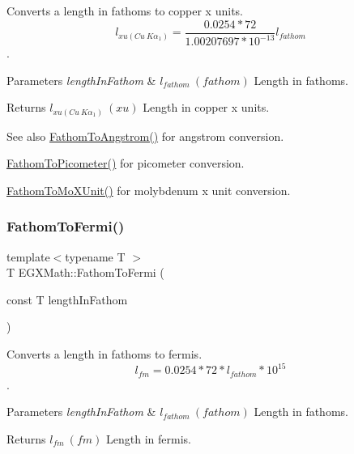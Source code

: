 Converts a length in fathoms to copper x units. \[ l_{xu(Cu\ K\alpha_1)}=\frac{0.0254 * 72}{1.00207697*10^{-13}} l_{fathom}\]. 


\begin{DoxyParams}{Parameters}
{\em length\+In\+Fathom} & $ l_{fathom}\ (fathom)$ Length in fathoms. \\
\hline
\end{DoxyParams}
\begin{DoxyReturn}{Returns}
$ l_{xu(Cu\ K\alpha_1)}\ (xu)$ Length in copper x units. 
\end{DoxyReturn}
\begin{DoxySeeAlso}{See also}
\mbox{\hyperlink{group___e_g_x_math-_conversions-_length_conversions-_imperial-_fathom-_non-_s_i_gac03859840078c2a19cbf1f79bcf2b919}{Fathom\+To\+Angstrom()}} for angstrom conversion. 

\mbox{\hyperlink{group___e_g_x_math-_conversions-_length_conversions-_imperial-_fathom-_s_i_gad5fe5d3a1a48420dc43cd2826a9b6f71}{Fathom\+To\+Picometer()}} for picometer conversion. 

\mbox{\hyperlink{group___e_g_x_math-_conversions-_length_conversions-_imperial-_fathom-_non-_s_i_ga1e69cf778d1b7f72cd015b6cc81fc71c}{Fathom\+To\+Mo\+X\+Unit()}} for molybdenum x unit conversion. 
\end{DoxySeeAlso}
\mbox{\label{group___e_g_x_math-_conversions-_length_conversions-_imperial-_fathom-_non-_s_i_ga4590b655273e874c79a47de291226548}} 
\subsubsection{\texorpdfstring{Fathom\+To\+Fermi()}{FathomToFermi()}}
{\footnotesize\ttfamily template$<$typename T $>$ \\
T E\+G\+X\+Math\+::\+Fathom\+To\+Fermi (\begin{DoxyParamCaption}\item[{const T}]{length\+In\+Fathom }\end{DoxyParamCaption})}



Converts a length in fathoms to fermis. \[ l_{fm}=0.0254 * 72 * l_{fathom} * 10^{15} \]. 


\begin{DoxyParams}{Parameters}
{\em length\+In\+Fathom} & $ l_{fathom}\ (fathom)$ Length in fathoms. \\
\hline
\end{DoxyParams}
\begin{DoxyReturn}{Returns}
$ l_{fm}\ (fm)$ Length in fermis. 
\end{DoxyReturn}
\mbox{\label{group___e_g_x_math-_conversions-_length_conversions-_imperial-_fathom-_non-_s_i_ga491b6bb1b4db49ba22471e9ca9855198}} 
